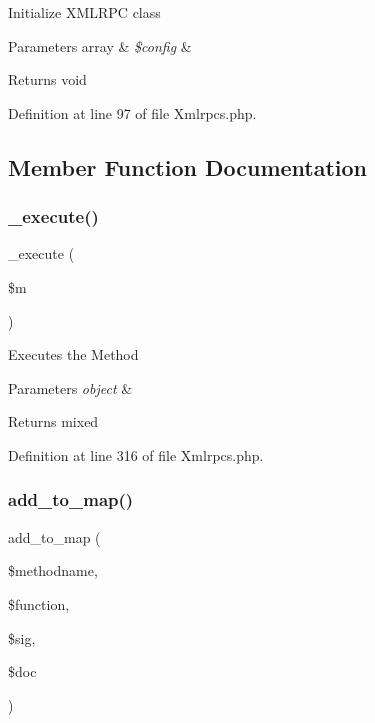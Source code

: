 Initialize X\+M\+L\+R\+PC class


\begin{DoxyParams}[1]{Parameters}
array & {\em \$config} & \\
\hline
\end{DoxyParams}
\begin{DoxyReturn}{Returns}
void 
\end{DoxyReturn}


Definition at line 97 of file Xmlrpcs.\+php.



\subsection{Member Function Documentation}
\mbox{\label{class_c_i___xmlrpcs_a2f039adb8ec59c693300993c95138b46}} 
\subsubsection{\texorpdfstring{\_execute()}{\_execute()}}
{\footnotesize\ttfamily \+\_\+execute (\begin{DoxyParamCaption}\item[{}]{\$m }\end{DoxyParamCaption})\hspace{0.3cm}{\ttfamily [protected]}}

Executes the Method


\begin{DoxyParams}{Parameters}
{\em object} & \\
\hline
\end{DoxyParams}
\begin{DoxyReturn}{Returns}
mixed 
\end{DoxyReturn}


Definition at line 316 of file Xmlrpcs.\+php.

\mbox{\label{class_c_i___xmlrpcs_a73b29191620c55a5e2d3fda3a5c3cf44}} 
\subsubsection{\texorpdfstring{add\_to\_map()}{add\_to\_map()}}
{\footnotesize\ttfamily add\+\_\+to\+\_\+map (\begin{DoxyParamCaption}\item[{}]{\$methodname,  }\item[{}]{\$function,  }\item[{}]{\$sig,  }\item[{}]{\$doc }\end{DoxyParamCaption})}

